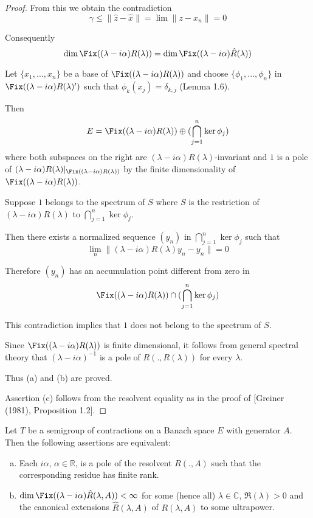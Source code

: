 \begin{proof}
From this we obtain the contradiction
\[
\gamma \leq \|\hat{z} - \hat{x}\| = \lim \|z - x_{n}\| = 0
\]

Consequently
\[
\dim \Fix((\lambda - i\alpha)R(\lambda)) = \dim \Fix((\lambda - i\alpha)\hat{R}(\lambda))
\]

Let $\{x_{1},...,x_{n}\}$ be a base of $\Fix((\lambda - i\alpha)R(\lambda))$ and choose $\{\phi_{1},...,\phi_{n}\}$ in $\Fix((\lambda - i\alpha)R(\lambda)')$ such that $\phi_{k}(x_{j}) = \delta_{k,j}$ (Lemma 1.6).

Then
\[
E = \Fix((\lambda - i\alpha)R(\lambda)) \oplus (\bigcap_{j=1}^{n} \ker\phi_{j})
\]
where both subspaces on the right are $(\lambda - i\alpha)R(\lambda)$-invariant and $1$ is a pole of $(\lambda-i\alpha)R(\lambda)|_{\Fix((\lambda-i\alpha)R(\lambda))}$ by the finite dimensionality of $\Fix((\lambda-i\alpha)R(\lambda))$.

Suppose $1$ belongs to the spectrum of $S$ where $S$ is the restriction of $(\lambda-i\alpha)R(\lambda)$ to $\bigcap_{j=1}^{n} \ker\phi_{j}$.

Then there exists a normalized sequence $(y_{n})$ in $\bigcap_{j=1}^{n} \ker\phi_{j}$ such that
\[
\lim_{n} \|(\lambda - i\alpha)R(\lambda)y_{n} - y_{n}\| = 0
\]

Therefore $(y_{n})$ has an accumulation point different from zero in
\[
\Fix((\lambda - i\alpha)R(\lambda)) \cap (\bigcap_{j=1}^{n} \ker\phi_{j})
\]

This contradiction implies that $1$ does not belong to the spectrum of $S$.

Since $\Fix((\lambda - i\alpha)R(\lambda))$ is finite dimensional, it follows from general spectral theory that $(\lambda - i\alpha)^{-1}$ is a pole of $R(.,R(\lambda))$ for every $\lambda$.

Thus (a) and (b) are proved.

Assertion (c) follows from the resolvent equality as in the proof of [Greiner (1981), Proposition 1.2].

\end{proof}




\begin{proposition}\label{prop:d3-2-3}
Let $T$ be a semigroup of contractions on a Banach space $E$ with generator $A$.
Then the following assertions are equivalent:
\begin{enumerate}[(a)]
\item
Each $i\alpha$, $\alpha \in \mathbb{R}$, is a pole of the resolvent $R(.,A)$ such that the corresponding residue has finite rank.
\item
$\dim \Fix((\lambda - i\alpha)\hat{R}(\lambda,A)) < \infty$ for some (hence all) $\lambda \in \mathbb{C}$, $\Re(\lambda) > 0$ and the canonical extensions $\hat{R}(\lambda,A)$ of $R(\lambda,A)$ to some ultrapower.
\end{enumerate}
\end{proposition}

